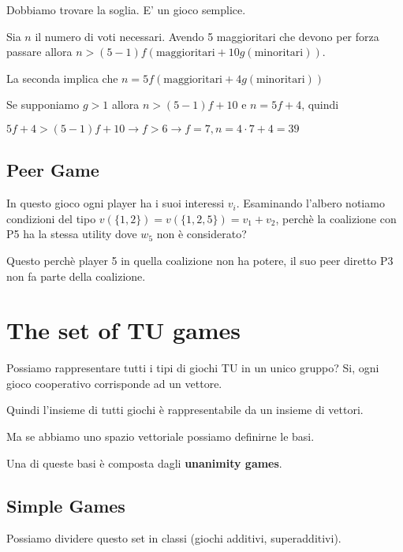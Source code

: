 \documentclass[10pt,a4paper]{report}
\begin{document}
        Dobbiamo trovare la soglia. E' un gioco semplice.

        Sia $n$ il numero di voti necessari. Avendo 5 maggioritari che devono per forza passare allora $n > (5-1)f(\text{maggioritari} + 10g(\text{minoritari}))$.

        La seconda implica che $n = 5f(\text{maggioritari} + 4g(\text{minoritari}))$

        Se supponiamo $g > 1$ allora $n > (5-1)f + 10$ e $n = 5f + 4$, quindi

        \begin{center}
            $5f + 4 > (5-1)f + 10 \rightarrow f > 6 \rightarrow f = 7, n = 4 \cdot 7 + 4 = 39$
        \end{center}

        \subsection{Peer Game}

        In questo gioco ogni player ha i suoi interessi $v_i$. Esaminando l'albero notiamo condizioni del tipo $v(\{1,2\}) = v(\{1,2, 5\}) = v_1 + v_2$, perchè la coalizione con P5 ha la stessa utility dove $w_5$ non è considerato?
        
        Questo perchè player 5 in quella coalizione non ha potere, il suo peer diretto P3 non fa parte della coalizione.

        \section{The set of TU games}

        Possiamo rappresentare tutti i tipi di giochi TU in un unico gruppo? Si, ogni gioco cooperativo corrisponde ad un vettore.

        Quindi l'insieme di tutti giochi è rappresentabile da un insieme di vettori.

        Ma se abbiamo uno spazio vettoriale possiamo definirne le basi.

        Una di queste basi è composta dagli \textbf{unanimity games}.

        \subsection{Simple Games}

        Possiamo dividere questo set in classi (giochi additivi, superadditivi).
\end{document}
